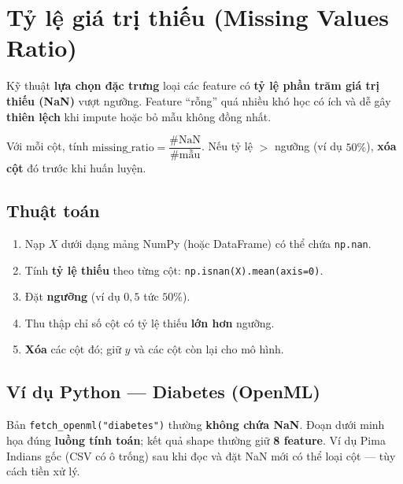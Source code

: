 \section{Tỷ lệ giá trị thiếu (Missing Values Ratio)}
\label{sec:missing-values-ratio}

\begin{dinhnghia}[title={Tỷ lệ giá trị thiếu}]
Kỹ thuật \textbf{lựa chọn đặc trưng} loại các feature có \textbf{tỷ lệ phần trăm giá trị thiếu (NaN)} vượt ngưỡng. Feature ``rỗng'' quá nhiều khó học có ích và dễ gây \textbf{thiên lệch} khi impute hoặc bỏ mẫu không đồng nhất.
\end{dinhnghia}

\begin{ynghia}[title={Nguyên tắc}]
Với mỗi cột, tính $\text{missing\_ratio} = \dfrac{\#\text{NaN}}{\#\text{mẫu}}$. Nếu tỷ lệ $>$ ngưỡng (ví dụ $50\%$), \textbf{xóa cột} đó trước khi huấn luyện.
\end{ynghia}

\subsection{Thuật toán}

\begin{phuongphap}[title={Các bước triển khai}]
\begin{enumerate}
  \item Nạp $X$ dưới dạng mảng NumPy (hoặc DataFrame) có thể chứa \texttt{np.nan}.
  \item Tính \textbf{tỷ lệ thiếu} theo từng cột: \texttt{np.isnan(X).mean(axis=0)}.
  \item Đặt \textbf{ngưỡng} (ví dụ $0{,}5$ tức $50\%$).
  \item Thu thập chỉ số cột có tỷ lệ thiếu \textbf{lớn hơn} ngưỡng.
  \item \textbf{Xóa} các cột đó; giữ $y$ và các cột còn lại cho mô hình.
\end{enumerate}
\end{phuongphap}

\subsection{Ví dụ Python --- Diabetes (OpenML)}

\begin{luuy}[title={Dữ liệu OpenML không có giá trị thiếu}]
Bản \texttt{fetch\_openml("diabetes")} thường \textbf{không chứa NaN}. Đoạn dưới minh họa đúng \textbf{luồng tính toán}; kết quả shape thường giữ \textbf{8 feature}. Ví dụ Pima Indians gốc (CSV có ô trống) sau khi đọc và đặt NaN mới có thể loại cột --- tùy cách tiền xử lý.
\end{luuy}

